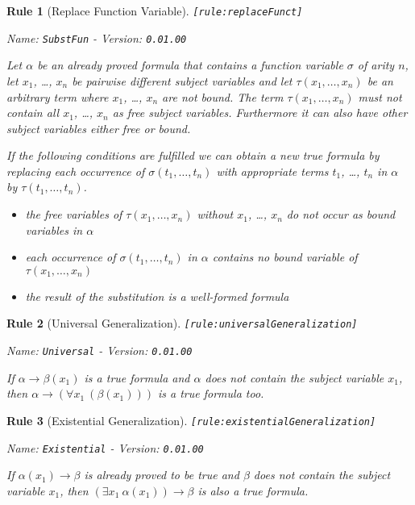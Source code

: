 \documentclass[a4paper,german,10pt,twoside]{book}
\newtheorem{rul}{Rule}
\theoremstyle{definition}
\theoremstyle{remark}
\begin{document}
\begin{rul}[Replace Function Variable]
\label{rule:replaceFunct} \hypertarget{rule:replaceFunct}{}
{\tt \tiny [\verb]rule:replaceFunct]]}

\par
{\em   Name: \verb]SubstFun]  -  Version: \verb]0.01.00]}


Let $\alpha$ be an already proved formula that contains a function variable $\sigma$ of arity $n$, let $x_1$, \ldots, $x_n$ be pairwise different subject variables and let $\tau(x_1, \ldots, x_n)$ be an arbitrary term where $x_1$, \ldots, $x_n$ are not bound. 
The term $\tau(x_1, \ldots, x_n)$ must not contain all $x_1$, \ldots, $x_n$ as free subject variables. Furthermore it can also have other subject variables either free or bound. 

If the following conditions are fulfilled we can obtain a new true formula by replacing each occurrence of $\sigma(t_1, \ldots, t_n)$ with appropriate terms $t_1$, \ldots, $t_n$ in $\alpha$ by $\tau(t_1, \ldots, t_n)$.

\begin{itemize}

\item 
the free variables of $\tau(x_1, \ldots, x_n)$ without $x_1$, \ldots, $x_n$ do not occur as bound variables in $\alpha$

\item
each occurrence of $\sigma(t_1, \ldots, t_n)$ in $\alpha$ contains no bound variable of $\tau(x_1, \ldots, x_n)$

\item
the result of the substitution is a well-formed formula
                  
\end{itemize}
\end{rul}


\begin{rul}[Universal Generalization]
\label{rule:universalGeneralization} \hypertarget{rule:universalGeneralization}{}
{\tt \tiny [\verb]rule:universalGeneralization]]}

\par
{\em   Name: \verb]Universal]  -  Version: \verb]0.01.00]}


If $\alpha \rightarrow \beta(x_1)$ is a true formula and $\alpha$ does not contain the subject variable $x_1$, then $\alpha \rightarrow (\forall x_1~(\beta(x_1)))$ is a true 
formula too.
\end{rul}


\begin{rul}[Existential Generalization]
\label{rule:existentialGeneralization} \hypertarget{rule:existentialGeneralization}{}
{\tt \tiny [\verb]rule:existentialGeneralization]]}

\par
{\em   Name: \verb]Existential]  -  Version: \verb]0.01.00]}


If $\alpha(x_1) \rightarrow \beta$ is already proved to be true and $\beta$ does not contain the subject variable $x_1$, then $(\exists x_1~\alpha(x_1)) \rightarrow \beta$ is also a true formula.
\end{rul}
\end{document}

